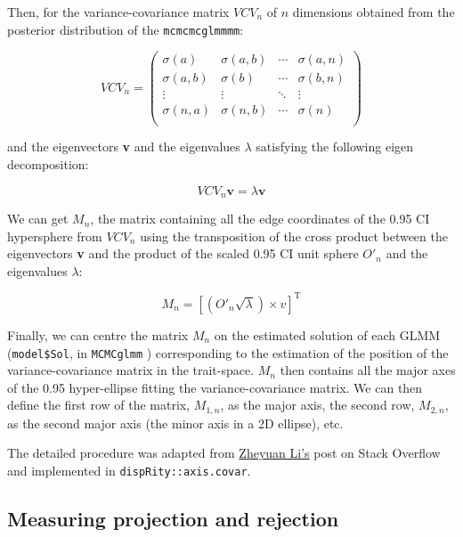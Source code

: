 \documentclass[12pt,letterpaper]{article}
\begin{document}
Then, for the variance-covariance matrix $VCV_{n}$ of $n$ dimensions obtained from the posterior distribution of the \texttt{mcmcmcglmmmm}:

\begin{equation}
VCV_{n} = 
    \begin{pmatrix}
        \sigma(a) & \sigma(a,b) & \cdots & \sigma(a,n) \\
        \sigma(a,b) & \sigma(b) & \cdots & \sigma(b,n) \\
        \vdots  & \vdots  & \ddots & \vdots  \\
        \sigma(n,a) & \sigma(n,b) & \cdots & \sigma(n) \\
    \end{pmatrix}
\end{equation}

and the eigenvectors \textbf{v} and the eigenvalues $\lambda$ satisfying the following eigen decomposition:

$$VCV_{n} \textbf{v} = \lambda \textbf{v}$$

We can get $M_{n}$, the matrix containing all the edge coordinates of the 0.95 CI hypersphere from $VCV_{n}$ using the transposition of the cross product between the eigenvectors \textbf{v} and the product of the scaled 0.95 CI unit sphere $O'_{n}$ and the eigenvalues $\lambda$:

$$M_{n} = [(O'_{n}\sqrt{\lambda}) \times v]^{\text{T}}$$

Finally, we can centre the matrix $M_{n}$ on the estimated solution of each GLMM (\texttt{model\$Sol}, in \texttt{MCMCglmm} \cite{MCMCglmm}) corresponding to the estimation of the position of the variance-covariance matrix in the trait-space.
$M_{n}$ then contains all the major axes of the 0.95 hyper-ellipse fitting the variance-covariance matrix.
We can then define the first row of the matrix, $M_{1,n}$, as the major axis, the second row, $M_{2,n}$, as the second major axis (the minor axis in a 2D ellipse), etc.

The detailed procedure was adapted from \href{https://stackoverflow.com/questions/40300217/obtain-vertices-of-the-ellipse-on-an-ellipse-covariance-plot-created-by-care/40316331#40316331}{Zheyuan Li's} post on Stack Overflow and implemented in \texttt{dispRity::axis.covar}.

\subsection{Measuring projection and rejection}
\end{document}
